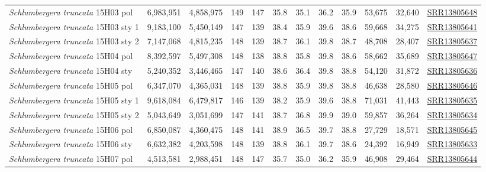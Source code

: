 \documentclass[fleqn,10pt,lineno]{wlpeerj}
\begin{document}
\begin{table}[ht]
{\begin{tabular}{l|cc|cc|cc|cc|cc|c}
\textit{Schlumbergera truncata} 15H03 pol   & 6,983,951 & 4,858,975 & 149 & 147 & 35.8 & 35.1 & 36.2 & 35.9 & 53,675 & 32,640 & \href{https://trace.ncbi.nlm.nih.gov/Traces/sra/?run=SRR13805648}{SRR13805648} \\
\textit{Schlumbergera truncata} 15H03 sty 1 & 9,183,100 & 5,450,149 & 147 & 139 & 38.4 & 35.9 & 39.6 & 38.6 & 59,668 & 34,275 & \href{https://trace.ncbi.nlm.nih.gov/Traces/sra/?run=SRR13805641}{SRR13805641} \\
\textit{Schlumbergera truncata} 15H03 sty 2 & 7,147,068 & 4,815,235 & 148 & 139 & 38.7 & 36.1 & 39.8 & 38.7 & 48,708 & 28,407 & \href{https://trace.ncbi.nlm.nih.gov/Traces/sra/?run=SRR13805637}{SRR13805637} \\
\textit{Schlumbergera truncata} 15H04 pol   & 8,392,597 & 5,497,308 & 148 & 138 & 38.8 & 35.8 & 39.8 & 38.6 & 58,662 & 35,689 & \href{https://trace.ncbi.nlm.nih.gov/Traces/sra/?run=SRR13805647}{SRR13805647} \\
\textit{Schlumbergera truncata} 15H04 sty   & 5,240,352 & 3,446,465 & 147 & 140 & 38.6 & 36.4 & 39.8 & 38.8 & 54,120 & 31,872 & \href{https://trace.ncbi.nlm.nih.gov/Traces/sra/?run=SRR13805636}{SRR13805636} \\
\textit{Schlumbergera truncata} 15H05 pol   & 6,347,070 & 4,365,031 & 148 & 139 & 38.8 & 35.9 & 39.8 & 38.8 & 46,638 & 28,580 & \href{https://trace.ncbi.nlm.nih.gov/Traces/sra/?run=SRR13805646}{SRR13805646} \\
\textit{Schlumbergera truncata} 15H05 sty 1 & 9,618,084 & 6,479,817 & 146 & 139 & 38.2 & 35.9 & 39.6 & 38.8 & 71,031 & 41,443 & \href{https://trace.ncbi.nlm.nih.gov/Traces/sra/?run=SRR13805635}{SRR13805635} \\
\textit{Schlumbergera truncata} 15H05 sty 2 & 5,043,649 & 3,051,699 & 147 & 141 & 38.7 & 36.8 & 39.9 & 39.0 & 59,857 & 36,264 & \href{https://trace.ncbi.nlm.nih.gov/Traces/sra/?run=SRR13805634}{SRR13805634} \\
\textit{Schlumbergera truncata} 15H06 pol   & 6,850,087 & 4,360,475 & 148 & 141 & 38.9 & 36.5 & 39.7 & 38.8 & 27,729 & 18,571 & \href{https://trace.ncbi.nlm.nih.gov/Traces/sra/?run=SRR13805645}{SRR13805645} \\
\textit{Schlumbergera truncata} 15H06 sty   & 6,632,382 & 4,203,598 & 148 & 139 & 38.8 & 36.1 & 39.7 & 38.6 & 24,392 & 16,949 & \href{https://trace.ncbi.nlm.nih.gov/Traces/sra/?run=SRR13805633}{SRR13805633} \\
\textit{Schlumbergera truncata} 15H07 pol   & 4,513,581 & 2,988,451 & 148 & 147 & 35.7 & 35.0 & 36.2 & 35.9 & 46,908 & 29,464 & \href{https://trace.ncbi.nlm.nih.gov/Traces/sra/?run=SRR13805644}{SRR13805644} \\

\end{tabular}}
\end{table}
\end{document}
